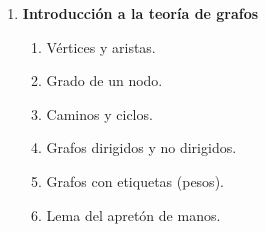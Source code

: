 \begin{enumerate}
  \item \textbf{Introducción a la teoría de grafos}

  \begin{enumerate}
    \item \label{itm:20.1} Vértices y aristas.
    \item \label{itm:20.2} Grado de un nodo.
    \item \label{itm:20.3} Caminos y ciclos.
    \item \label{itm:20.4} Grafos dirigidos y no dirigidos.
    \item \label{itm:20.5} Grafos con etiquetas (pesos).
    \item \label{itm:20.6} Lema del apretón de manos.
  \end{enumerate}

\end{enumerate}

